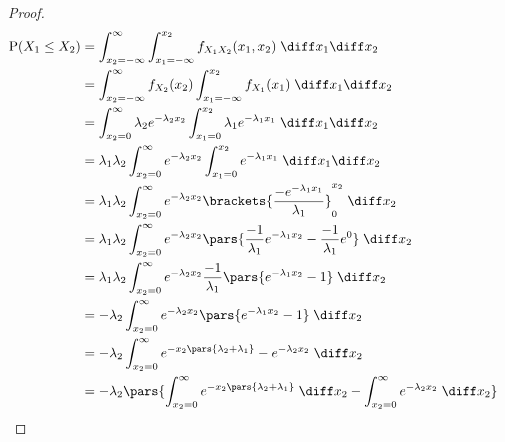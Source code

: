 \begin{proof}
	{
	\allowdisplaybreaks
	\begin{align*}
		\mathrm{P}(X_1 \leq X_2) & = \int_{x_2 = -\infty}^{\infty} \int_{x_1 = -\infty}^{x_2} f_{X_{1}X_{2}}(x_1, x_2) \; \diff x_{1} \diff x_{2}                                                                 & \\
		                         & = \int_{x_2 = -\infty}^{\infty} f_{X_{2}}(x_2) \int_{x_1 = -\infty}^{x_2} f_{X_1}(x_1) \; \diff x_{1} \diff x_{2}                                                                \\
		                         & = \int_{x_2 = 0}^{\infty} \lambda_2 e^{-\lambda_{2}x_2} \int_{x_1 = 0}^{x_2} \lambda_1 e^{-\lambda_1 x_1} \; \diff x_{1} \diff x_{2}                                             \\
		                         & = \lambda_1 \lambda_2 \int_{x_2 = 0}^{\infty} e^{-\lambda_{2}x_2} \int_{x_1 = 0}^{x_2} e^{-\lambda_1 x_1} \; \diff x_{1} \diff x_{2}                                             \\
		                         & = \lambda_1 \lambda_2 \int_{x_2 = 0}^{\infty} e^{-\lambda_{2}x_2} \brackets{\frac{-e^{-\lambda_1 x_1}}{\lambda_1} }_{0}^{x_2} \; \diff x_{2}                                     \\
		                         & = \lambda_1 \lambda_2 \int_{x_2 = 0}^{\infty} e^{-\lambda_{2}x_2} \pars{\frac{-1}{\lambda_1} e^{-\lambda_1 x_2} - \frac{-1}{\lambda_1} e^0} \; \diff x_2                         \\
		                         & = \lambda_1 \lambda_2 \int_{x_2 = 0}^{\infty} e^{-\lambda_2 x_2} \frac{-1}{\lambda_1} \pars{e^{-\lambda_1 x_2} - 1} \; \diff x_2                                                 \\
		                         & = -\lambda_2 \int_{x_2=0}^{\infty} e^{-\lambda_2 x_2} \pars{e^{-\lambda_1 x_2} - 1} \; \diff x_2                                                                                 \\
		                         & = -\lambda_2 \int_{x_2=0}^{\infty} e^{-x_2\pars{\lambda_2 + \lambda_1}} - e^{-\lambda_2 x_2} \; \diff x_2                                                                        \\
		                         & = -\lambda_2 \pars{\int_{x_2=0}^{\infty} e^{-x_2\pars{\lambda_2 + \lambda_1}} \; \diff x_2 - \int_{x_2=0}^{\infty} e^{-\lambda_2 x_2} \; \diff x_2}                              \\

\end{align*}}
\end{proof}
